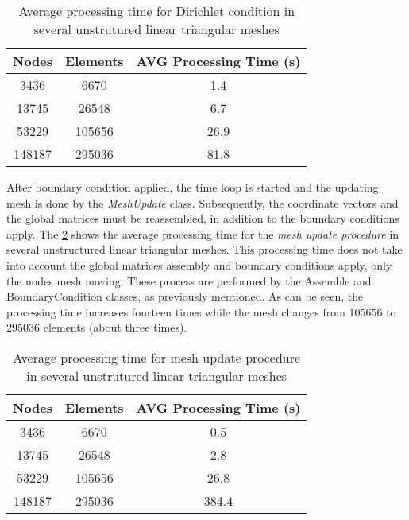 \vspace{0.5cm}
\begin{table}[H]
\centering
\begin{tabular}{ccc}
\toprule
\textbf{Nodes} & \textbf{Elements} & \textbf{AVG Processing Time} (s) \\
\midrule
3436 & 6670 & 1.4 \\
13745 & 26548 & 6.7 \\
53229 & 105656 & 26.9 \\
148187 & 295036 & 81.8 \\



\bottomrule
\end{tabular}
\caption{Average processing time for Dirichlet condition in several unstrutured linear triangular meshes}
\label{tempo contorno}
\end{table}
 
\medskip
After boundary condition applied, the time loop is started and
the updating mesh is done by the \textit{MeshUpdate} class.
Subsequently, the coordinate vectors and the global matrices
must be reassembled, in addition to the boundary conditions apply.
The \ref{tempo mesh update} 
shows the average processing time for the \textit{mesh update procedure}
in several unstructured linear triangular meshes.
This processing time does not take into account the global matrices assembly and
boundary conditions apply, only the nodes mesh moving. 
These process are performed by the
Assemble and BoundaryCondition classes, as previously mentioned. 
As can be seen, the processing time increases fourteen times 
while the mesh changes from 105656 to 295036 elements 
(about three times). 

\vspace{0.5cm}
\begin{table}[H]
\centering
\begin{tabular}{ccc}
\toprule
\textbf{Nodes} & \textbf{Elements} & \textbf{AVG Processing Time} (s) \\
\midrule
3436 & 6670 & 0.5 \\
13745 & 26548 & 2.8 \\
53229 & 105656 & 26.8 \\
148187 & 295036 & 384.4 \\



\bottomrule
\end{tabular}
\caption{Average processing time for mesh update procedure in several unstrutured linear triangular meshes}
\label{tempo mesh update}
\end{table}



